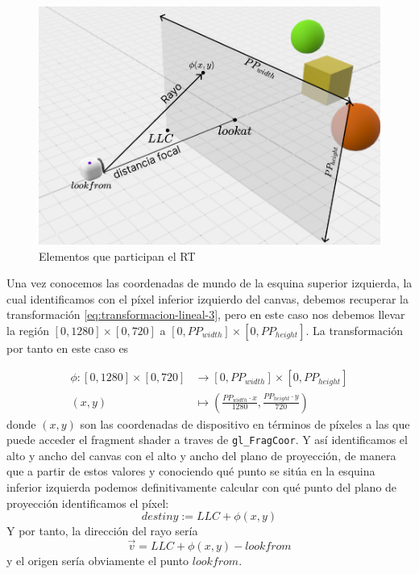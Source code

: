 \begin{figure} [ht]
    \centering
    \includegraphics[scale = 0.3    ]{img/C7/elementos-PP.png}
    \caption{Elementos que participan el RT}
    \label{fig:elementos}
\end{figure}

Una vez conocemos las coordenadas de mundo de la esquina superior izquierda, la cual identificamos con el píxel inferior izquierdo del canvas, debemos recuperar la transformación \ref{eq:transformacion-lineal-3}, pero en este caso nos debemos llevar la región $[0,1280]\times[0,720]$ a $[0,PP_{width}]\times[0,PP_{height}]$. La transformación por tanto en este caso es

\begin{equation}
    \label{eq:transformacion-lineal-4}
    \begin{split}
        \phi : [0,1280]\times [0,720] & \longrightarrow [0,PP_{width}]\times[0,PP_{height}] \\
        (x,y) & \longmapsto \left(\frac{PP_{width}\cdot x}{1280},\frac{PP_{height}\cdot y}{720}\right)
    \end{split}
\end{equation}
donde $(x,y)$ son las coordenadas de dispositivo en términos de píxeles a las que puede acceder el fragment shader a traves de \verb|gl_FragCoor|. Y así identificamos el alto y ancho del canvas con el alto y ancho del plano de proyección, de manera que a partir de estos valores y conociendo qué punto se sitúa en la esquina inferior izquierda podemos definitivamente calcular con qué punto del plano de proyección identificamos el píxel:
$$
destiny := LLC + \phi(x,y)
$$
Y por tanto, la dirección del rayo sería
$$
\vec v = LLC + \phi(x,y) - lookfrom
$$
y el origen sería obviamente el punto $lookfrom$.

